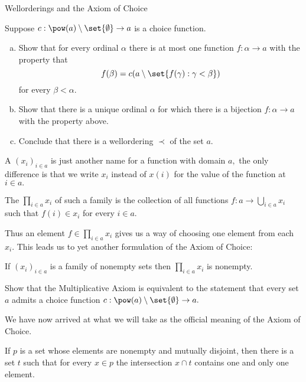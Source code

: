 \begin{unit}{Wellorderings and the Axiom of Choice}
\begin{problem}
  Suppose \(c:\pow(a)\setminus\set{\emptyset}\to a\) is a choice function.
  \begin{enumerate}[(a)]
  \item Show that for every ordinal \(\alpha\) there is at most one function \(f:\alpha \to a\) with the property that \[f(\beta) = c(a \setminus \set{f(\gamma) : \gamma < \beta})\] for every \(\beta < \alpha.\)
  \item Show that there is a unique ordinal \(\alpha\) for which there is a bijection \(f:\alpha \to a\) with the property above.
  \item Conclude that there is a wellordering \({\prec}\) of the set \(a.\)
  \end{enumerate}
\end{problem}

A  \((x_i)_{i \in a}\) is just another name for a function with domain \(a,\) the only difference is that we write \(x_i\) instead of \(x(i)\) for the value of the function at \(i \in a.\)

\begin{definition}
  The  \(\prod_{i \in a} x_i\) of such a family is the collection of all functions \(f:a \to \bigcup_{i \in a} x_i\) such that \(f(i) \in x_i\) for every \(i \in a.\)
\end{definition}

\noindent
Thus an element \(f \in \prod_{i \in a} x_i\) gives us a way of choosing one element from each \(x_i.\)
This leads us to yet another formulation of the Axiom of Choice:

\begin{theorem}\label{T:MultAx}
  If \((x_i)_{i \in a}\) is a family of nonempty sets then \(\prod_{i \in a} x_i\) is nonempty.
\end{theorem}

\begin{problem}
  Show that the Multiplicative Axiom is equivalent to the statement that every set \(a\) admits a choice function \(c:\pow(a)\setminus\set{\emptyset}\to a.\)
\end{problem}

We have now arrived at what we will take as the official meaning of the Axiom of Choice.

\begin{axiom}\label{A:Choice}
  If \(p\) is a set whose elements are nonempty and mutually disjoint, then there is a set \(t\) such that for every \(x \in p\) the intersection \(x \cap t\) contains one and only one element.
\end{axiom}


\end{unit}
